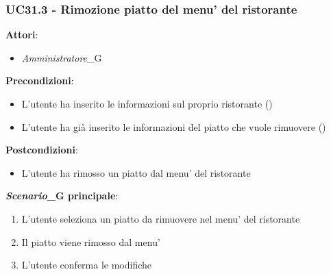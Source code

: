 \subsubsection{UC31.3 - Rimozione piatto del menu' del ristorante}\label{usecase:31_3}
\textbf{Attori}:
\begin{itemize}
    \item \textit{Amministratore}_G
\end{itemize}
\textbf{Precondizioni}:
\begin{itemize}
    \item L'utente ha inserito le informazioni sul proprio ristorante ()
    \item L'utente ha già inserito le informazioni del piatto che vuole rimuovere ()
\end{itemize}
\textbf{Postcondizioni}:
\begin{itemize}
    \item L'utente ha rimosso un piatto dal menu' del ristorante
\end{itemize}
\textbf{\textit{Scenario}_G principale}:
\begin{enumerate}
    \item L'utente seleziona un piatto da rimuovere nel menu' del ristorante
    \item Il piatto viene rimosso dal menu'
    \item L'utente conferma le modifiche
\end{enumerate}
\newpage